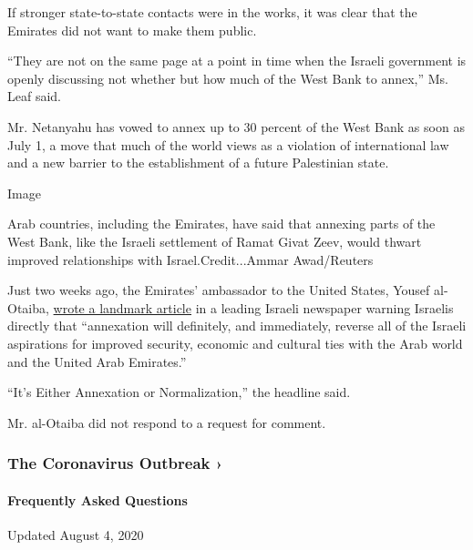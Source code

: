 If stronger state-to-state contacts were in the works, it was clear that
the Emirates did not want to make them public.

``They are not on the same page at a point in time when the Israeli
government is openly discussing not whether but how much of the West
Bank to annex,'' Ms. Leaf said.

Mr. Netanyahu has vowed to annex up to 30 percent of the West Bank as
soon as July 1, a move that much of the world views as a violation of
international law and a new barrier to the establishment of a future
Palestinian state.

Image

Arab countries, including the Emirates, have said that annexing parts of
the West Bank, like the Israeli settlement of Ramat Givat Zeev, would
thwart improved relationships with Israel.Credit...Ammar Awad/Reuters

Just two weeks ago, the Emirates' ambassador to the United States,
Yousef al-Otaiba,
\href{https://www.nytimes3xbfgragh.onion/2020/06/12/world/middleeast/west-bank-annexation-israel-uae.html}{wrote
a landmark article} in a leading Israeli newspaper warning Israelis
directly that ``annexation will definitely, and immediately, reverse all
of the Israeli aspirations for improved security, economic and cultural
ties with the Arab world and the United Arab Emirates.''

``It's Either Annexation or Normalization,'' the headline said.

Mr. al-Otaiba did not respond to a request for comment.

\href{https://www.nytimes3xbfgragh.onion/news-event/coronavirus?action=click\&pgtype=Article\&state=default\&region=MAIN_CONTENT_3\&context=storylines_faq}{}

\hypertarget{the-coronavirus-outbreak-}{%
\subsubsection{The Coronavirus Outbreak
›}\label{the-coronavirus-outbreak-}}

\hypertarget{frequently-asked-questions}{%
\paragraph{Frequently Asked
Questions}\label{frequently-asked-questions}}

Updated August 4, 2020

